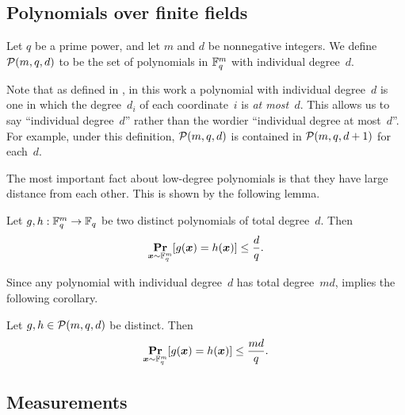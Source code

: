 \subsection{Polynomials over finite fields}

\begin{definition}
Let $q$ be a prime power,
and let $m$ and $d$ be nonnegative integers.
We define $\mathcal{P}(m, q, d)$ to be the set of polynomials in $\mathbb F_q^m$
with individual degree~$d$.
\end{definition}

\begin{remark}
Note that as defined in ,
in this work a polynomial with individual degree~$d$ is one in which the degree~$d_i$ of each coordinate~$i$
is \emph{at most~$d$}.
This allows us to say ``individual degree~$d$'' rather than the wordier ``individual degree at most~$d$''.
For example, under this definition, $\mathcal{P}(m, q, d)$ is contained in $\mathcal{P}(m, q, d+1)$ for each~$d$.
\end{remark}

The most important fact about low-degree polynomials is that they have large distance from each other.
This is shown by the following lemma.

\begin{lemma}\label{lem:schwartz-zippel-total-degree}
Let $g, h:\mathbb F_q^m \rightarrow \mathbb F_q$ be two distinct polynomials of total degree~$d$.
Then
\begin{equation*}
\mathop{\bf Pr\/}_{{\boldsymbol{x}} \sim \mathbb F_q^m}[g({\boldsymbol{x}}) = h({\boldsymbol{x}})] \leq \frac{d}{q}.
\end{equation*}
\end{lemma}

Since any polynomial with individual degree~$d$ has total degree~$md$,
 implies the following corollary.

\begin{corollary}
Let $g, h \in \mathcal{P}(m, q, d)$ be distinct. Then
\begin{equation*}
\mathop{\bf Pr\/}_{{\boldsymbol{x}} \sim \mathbb F_q^m}[g({\boldsymbol{x}}) = h({\boldsymbol{x}})] \leq \frac{md}{q}.
\end{equation*}
\end{corollary}

\subsection{Measurements}

